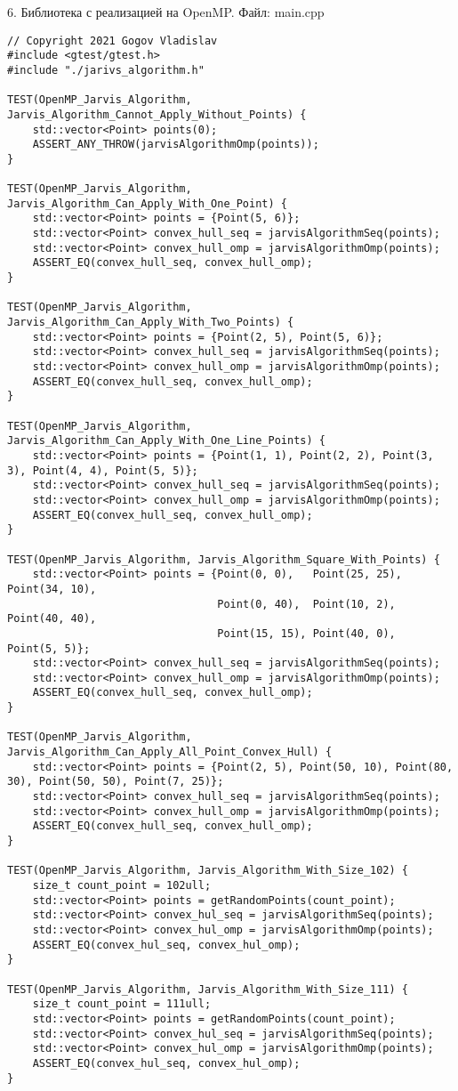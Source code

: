 \documentclass{report}
\begin{document}
\par 6. Библиотека с реализацией на OpenMP. Файл: main.cpp
\begin{lstlisting}
// Copyright 2021 Gogov Vladislav
#include <gtest/gtest.h>
#include "./jarivs_algorithm.h"

TEST(OpenMP_Jarvis_Algorithm, Jarvis_Algorithm_Cannot_Apply_Without_Points) {
    std::vector<Point> points(0);
    ASSERT_ANY_THROW(jarvisAlgorithmOmp(points));
}

TEST(OpenMP_Jarvis_Algorithm, Jarvis_Algorithm_Can_Apply_With_One_Point) {
    std::vector<Point> points = {Point(5, 6)};
    std::vector<Point> convex_hull_seq = jarvisAlgorithmSeq(points);
    std::vector<Point> convex_hull_omp = jarvisAlgorithmOmp(points);
    ASSERT_EQ(convex_hull_seq, convex_hull_omp);
}

TEST(OpenMP_Jarvis_Algorithm, Jarvis_Algorithm_Can_Apply_With_Two_Points) {
    std::vector<Point> points = {Point(2, 5), Point(5, 6)};
    std::vector<Point> convex_hull_seq = jarvisAlgorithmSeq(points);
    std::vector<Point> convex_hull_omp = jarvisAlgorithmOmp(points);
    ASSERT_EQ(convex_hull_seq, convex_hull_omp);
}

TEST(OpenMP_Jarvis_Algorithm, Jarvis_Algorithm_Can_Apply_With_One_Line_Points) {
    std::vector<Point> points = {Point(1, 1), Point(2, 2), Point(3, 3), Point(4, 4), Point(5, 5)};
    std::vector<Point> convex_hull_seq = jarvisAlgorithmSeq(points);
    std::vector<Point> convex_hull_omp = jarvisAlgorithmOmp(points);
    ASSERT_EQ(convex_hull_seq, convex_hull_omp);
}

TEST(OpenMP_Jarvis_Algorithm, Jarvis_Algorithm_Square_With_Points) {
    std::vector<Point> points = {Point(0, 0),   Point(25, 25), Point(34, 10),
                                 Point(0, 40),  Point(10, 2),  Point(40, 40),
                                 Point(15, 15), Point(40, 0),  Point(5, 5)};
    std::vector<Point> convex_hull_seq = jarvisAlgorithmSeq(points);
    std::vector<Point> convex_hull_omp = jarvisAlgorithmOmp(points);
    ASSERT_EQ(convex_hull_seq, convex_hull_omp);
}

TEST(OpenMP_Jarvis_Algorithm, Jarvis_Algorithm_Can_Apply_All_Point_Convex_Hull) {
    std::vector<Point> points = {Point(2, 5), Point(50, 10), Point(80, 30), Point(50, 50), Point(7, 25)};
    std::vector<Point> convex_hull_seq = jarvisAlgorithmSeq(points);
    std::vector<Point> convex_hull_omp = jarvisAlgorithmOmp(points);
    ASSERT_EQ(convex_hull_seq, convex_hull_omp);
}

TEST(OpenMP_Jarvis_Algorithm, Jarvis_Algorithm_With_Size_102) {
    size_t count_point = 102ull;
    std::vector<Point> points = getRandomPoints(count_point);
    std::vector<Point> convex_hul_seq = jarvisAlgorithmSeq(points);
    std::vector<Point> convex_hul_omp = jarvisAlgorithmOmp(points);
    ASSERT_EQ(convex_hul_seq, convex_hul_omp);
}

TEST(OpenMP_Jarvis_Algorithm, Jarvis_Algorithm_With_Size_111) {
    size_t count_point = 111ull;
    std::vector<Point> points = getRandomPoints(count_point);
    std::vector<Point> convex_hul_seq = jarvisAlgorithmSeq(points);
    std::vector<Point> convex_hul_omp = jarvisAlgorithmOmp(points);
    ASSERT_EQ(convex_hul_seq, convex_hul_omp);
}
\end{lstlisting}
\end{document}
